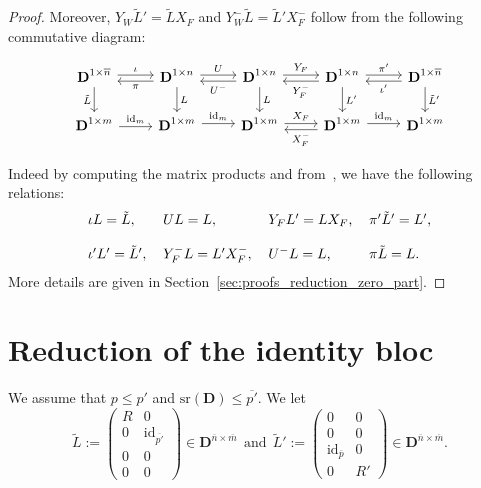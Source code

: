 \documentclass[10pt]{article}
\newcommand\g[1]{\textbf{#1}}
\newcommand\id[1]{\text{id}_{#1}}
\newcommand\sr[1]{\text{sr}\left(#1\right)}
\newcommand\D{\g{D}}
\begin{document}
\begin{proof}
  Moreover, $Y_W\tilde{L}'=\tilde{L}X_F$ and $Y_W^-\tilde{L}=\tilde{L}'
  X_F^-$ follow from the following commutative diagram:
  \begin{center}
    \begin{equation}\label{equ:main_commutative_diagram_zero_part}
      \begin{tikzcd}
        \D^{1\times\overline{n}}\arrow[d, "\tilde{L}"']\arrow[r, "\iota", shift right=-0.5ex] &
        \D^{1\times n}\arrow[d, "L"]\arrow[r, "U", shift right=-0.5ex]
        \arrow[l, "\pi", shift left=0.5ex] &
        \D^{1\times n}\arrow[d, "L"]\arrow[r, "Y_F", shift right=-0.5ex] 
        \arrow[l, "U^-", shift right=-0.5ex] &
        \D^{1\times n}\arrow[d, "L'"]\arrow[r, "\pi'", shift right=-0.5ex] 
        \arrow[l, "Y_F^-", shift right=-0.5ex] &
        \D^{1\times\overline{n}}\arrow[d, "\tilde{L}'"]
        \arrow[l, "\iota'", shift right=-0.5ex] 
        \\
        \D^{1\times m}\arrow[r, "\id{m}"] &
        \D^{1\times m}\arrow[r, "\id{m}", shift right=-0.5ex]
        &
        \D^{1\times m}\arrow[r, "X_F", shift right=-0.5ex]
        &
        \D^{1\times m}\arrow[r, "\id{m}", shift right=-0.5ex]
        \arrow[l, "X_F^-", shift right=-0.5ex] &
        \D^{1\times m}
      \end{tikzcd}
    \end{equation}
  \end{center}
  Indeed by computing the matrix products and
  from~\cite{cluzeau2011constructive}, we have the following relations:
  \begin{equation}
    \label{eq:formulas_reduction_zero_part}
    \begin{tabular}{l l l l}
      $\iota L=\tilde{L},$ & $UL=L,$ & $Y_FL'=LX_F$, & $\pi'\tilde{L}'=L'$,\\
      & & \\
      $\iota'L'=\tilde{L}',$ & $Y_F^-L=L'X_F^-,$ & $U^-L=L$, & $\pi\tilde{L}
      =L$.
    \end{tabular}
  \end{equation}
  More details are given in Section~\ref{sec:proofs_reduction_zero_part}.
\end{proof}

\section{Reduction of the identity bloc}

We assume that $p\leq p'$ and $\sr{\D}\leq\overline{p'}$. We let
\[\tilde{L}:=\begin{pmatrix}
R & 0\\
0 & \id{\overline{p'}}\\
0 & 0\\
0 & 0
\end{pmatrix}\in\D^{\overline{n}\times\overline{m}}\ \
\text{and}\ \
\tilde{L}':=\begin{pmatrix}
0 & 0\\
0 & 0\\
\id{\overline{p}} & 0\\
0 & R'
\end{pmatrix}\in\D^{\overline{n}\times\overline{m}}.\]
\end{document}
